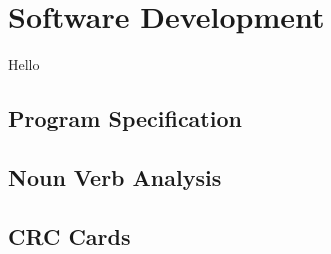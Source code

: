 \chapter{Software Development}

Hello

\section{Program Specification}

\section{Noun Verb Analysis}

\section{CRC Cards}

